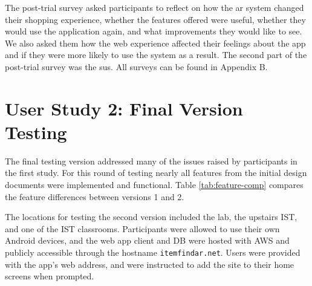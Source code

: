 \documentclass[thesis]{fputhesis}
\newcommand{\ra}[1]{\renewcommand{\arraystretch}{#1}}
\begin{document}
\begin{body}
The post-trial survey asked participants to reflect on how the \acrshort{ar} system changed their shopping experience, whether the features offered were useful, whether they would use the application again, and what improvements they would like to see. We also asked them how the web experience affected their feelings about the app and if they were more likely to use the system as a result. The second part of the post-trial survey was the \acrshort{sus}. All surveys can be found in Appendix B.

\section{User Study 2: Final Version Testing}
The final testing version addressed many of the issues raised by participants in the first study. For this round of testing nearly all features from the initial design documents were implemented and functional. Table \ref{tab:feature-comp} compares the feature differences between versions 1 and 2. 

The locations for testing the second version included the lab, the upstairs IST, and one of the IST classrooms. Participants were allowed to use their own Android devices, and the web app client and DB were hosted with AWS and publicly accessible through the hostname \verb|itemfindar.net|. Users were provided with the app's web address, and were instructed to add the site to their home screens when prompted.

\begin{table}[h]\centering
\caption{Comparison of app features between the first and second studies.}\label{tab:feature-comp}
\ra{1.2}
\end{table}

\end{body}
\end{document}
